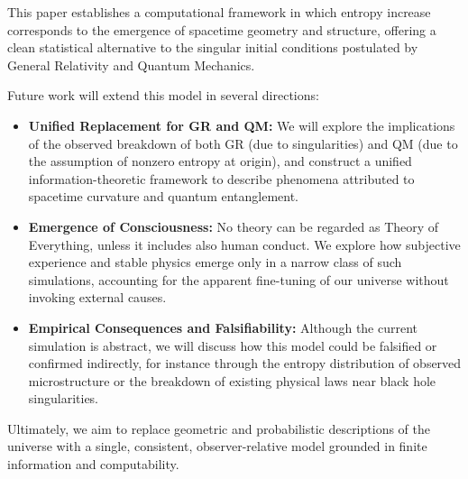 \documentclass[11pt]{article}
\begin{document}
This paper establishes a computational framework in which entropy increase corresponds to the emergence of spacetime geometry and structure, offering a clean statistical alternative to the singular initial conditions postulated by General Relativity and Quantum Mechanics.

Future work will extend this model in several directions:

\begin{itemize}
   \item \textbf{Unified Replacement for GR and QM:} We will explore the implications of the observed breakdown of both GR (due to singularities) and QM (due to the assumption of nonzero entropy at origin), and construct a unified information-theoretic framework to describe phenomena attributed to spacetime curvature and quantum entanglement.

   \item \textbf{Emergence of Consciousness:} No theory can be regarded as Theory of Everything, unless it includes also human conduct. We explore how subjective experience and stable physics emerge only in a narrow class of such simulations, accounting for the apparent fine-tuning of our universe without invoking external causes.

   \item \textbf{Empirical Consequences and Falsifiability:} Although the current simulation is abstract, we will discuss how this model could be falsified or confirmed indirectly, for instance through the entropy distribution of observed microstructure or the breakdown of existing physical laws near black hole singularities.
\end{itemize}

Ultimately, we aim to replace geometric and probabilistic descriptions of the universe with a single, consistent, observer-relative model grounded in finite information and computability.
\end{document}
